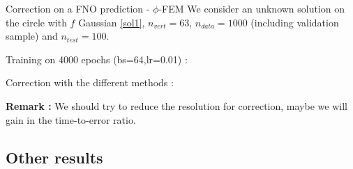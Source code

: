 \begin{frame}{Correction on a FNO prediction - $\phi$-FEM}
    We consider an unknown solution on the circle with $f$ Gaussian \eqref{sol1}, $n_{vert}=63$, $n_{data}=1000$ (including validation sample) and $n_{test}=100$. 

    \vspace{10pt}
    \begin{minipage}{0.38\linewidth}
        Training on 4000 epochs (bs=64,lr=0.01) :
        \centering
    \end{minipage}
    \begin{minipage}{0.58\linewidth}
        Correction with the different methods :
        \centering
    \end{minipage}	
    
    \vspace{5pt}
    \footnotesize
    \textbf{Remark :} We should try to reduce the resolution for correction, maybe we will gain in the time-to-error ratio.
\end{frame}

\subsection{Other results}


        
        
        
        

        
    
